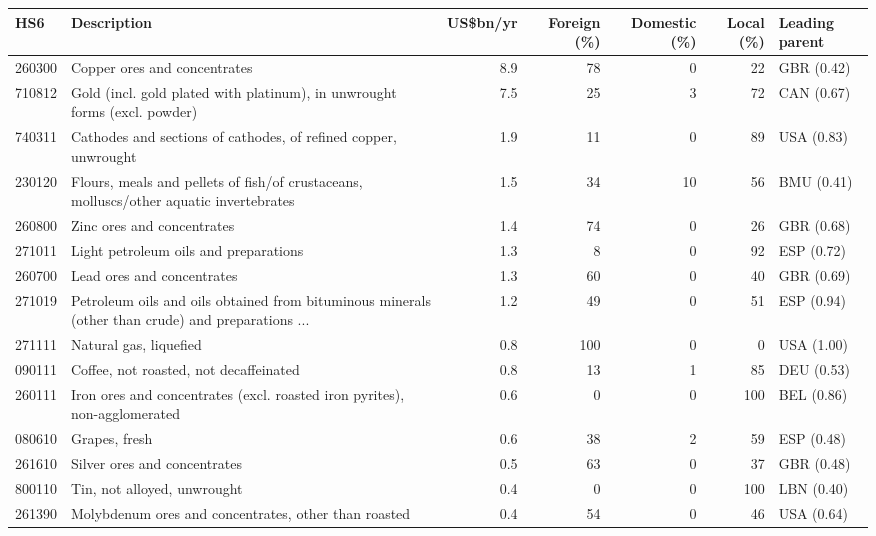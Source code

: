 \begin{tabular}{@{}l p{6.4cm} r r r r l@{}}
\toprule
HS6 & Description & US\$bn/yr & Foreign (\%) & Domestic (\%) & Local (\%) & Leading parent \\
\midrule
260300 & Copper ores and concentrates & 8.9 & 78 & 0 & 22 & GBR (0.42) \\
710812 & Gold (incl. gold plated with platinum), in unwrought forms (excl. powder) & 7.5 & 25 & 3 & 72 & CAN (0.67) \\
740311 & Cathodes and sections of cathodes, of refined copper, unwrought & 1.9 & 11 & 0 & 89 & USA (0.83) \\
230120 & Flours, meals and pellets of fish/\allowbreak{}of crustaceans, molluscs/\allowbreak{}other aquatic invertebrates & 1.5 & 34 & 10 & 56 & BMU (0.41) \\
260800 & Zinc ores and concentrates & 1.4 & 74 & 0 & 26 & GBR (0.68) \\
271011 & Light petroleum oils and preparations & 1.3 & 8 & 0 & 92 & ESP (0.72) \\
260700 & Lead ores and concentrates & 1.3 & 60 & 0 & 40 & GBR (0.69) \\
271019 & Petroleum oils and oils obtained from bituminous minerals (other than crude) and preparations ... & 1.2 & 49 & 0 & 51 & ESP (0.94) \\
271111 & Natural gas, liquefied & 0.8 & 100 & 0 & 0 & USA (1.00) \\
090111 & Coffee, not roasted, not decaffeinated & 0.8 & 13 & 1 & 85 & DEU (0.53) \\
260111 & Iron ores and concentrates (excl. roasted iron pyrites), non-agglomerated & 0.6 & 0 & 0 & 100 & BEL (0.86) \\
080610 & Grapes, fresh & 0.6 & 38 & 2 & 59 & ESP (0.48) \\
261610 & Silver ores and concentrates & 0.5 & 63 & 0 & 37 & GBR (0.48) \\
800110 & Tin, not alloyed, unwrought & 0.4 & 0 & 0 & 100 & LBN (0.40) \\
261390 & Molybdenum ores and concentrates, other than roasted & 0.4 & 54 & 0 & 46 & USA (0.64) \\
\bottomrule
\end{tabular}
